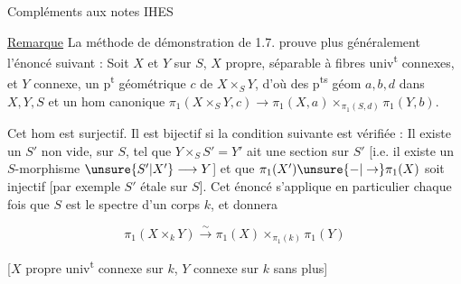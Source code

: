 Compléments aux notes IHES


\uline{Remarque} La méthode de démonstration de 1.7. prouve plus généralement l'énoncé suivant : Soit $X$ et $Y$ sur $S$, $X$ propre,  séparable à fibres univ\textsuperscript{t} connexes, et $Y$ connexe,   un p\textsuperscript{t} géométrique $c$ de $X\times_S Y$, d'où des p\textsuperscript{ts} géom $a,b,d$ dans $X,Y,S$ et un hom canonique $\pi_1(X\times_S Y,c)\longrightarrow\pi_1(X,a)\times_{\pi_1(S,d)}\pi_1(Y,b)$.

Cet hom est surjectif.  Il est bijectif si  la condition suivante est vérifiée : Il existe un $S'$   non vide,  sur $S$, tel que $Y\times_S S'=Y'$ ait une section sur $S'$ [i.e.  il existe un $S$-morphisme $\unsure{S'|X'}\longrightarrow Y$]  et que $\pi_1(X')\unsure{-|\to}\pi_1(X)$ soit injectif [par exemple  $S'$ étale sur $S$]. Cet énoncé s'applique en particulier chaque fois que $S$ est le spectre d'un corps $k$, et donnera


\[
\pi_1(X\times_k Y)\xrightarrow{\sim}\pi_1(X)\times_{\pi_1(k)}\pi_1(Y)
\]

[$X$ propre univ\textsuperscript{t} connexe sur $k$, $Y$  connexe sur $k$ sans plus]


